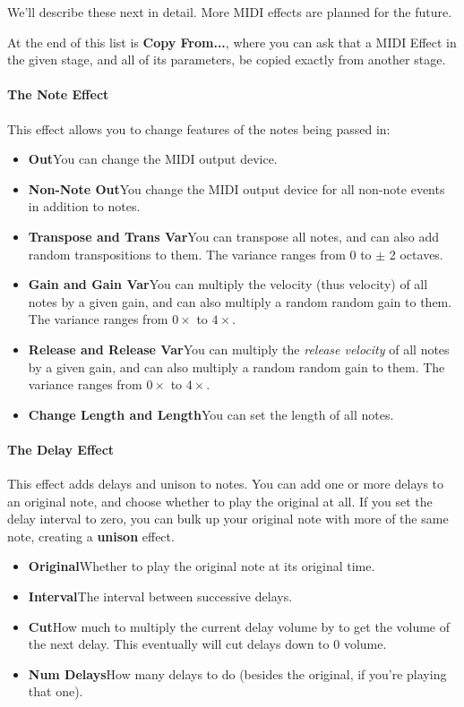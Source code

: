 \documentclass[twoside,10pt]{article}
\begin{document}
We'll describe these next in detail.  More MIDI effects are planned for the future.

At the end of this list is {\bf Copy From...}, where you can ask that a MIDI Effect in the given stage, and all of its parameters, be copied exactly from another stage.

\paragraph{The Note Effect}

This effect allows you to change features of the notes being passed in:

\begin{itemize}
\item {\bf Out}\qquad You can change the MIDI output device.
\item {\bf Non-Note Out}\qquad You change the MIDI output device for all non-note events in addition to notes.
\item {\bf Transpose and Trans Var}\qquad You can transpose all notes, and can also add random transpositions to them.  The variance ranges from \(0\) to \(\pm\) 2 octaves.
\item {\bf Gain and Gain Var}\qquad You can multiply the velocity (thus velocity) of all notes by a given gain, and can also multiply a random random gain to them.  The variance ranges from \(0\times\) to \(4\times\).
\item {\bf Release and Release Var}\qquad You can multiply the {\it release velocity} of all notes by a given gain, and can also multiply a random random gain to them.  The variance ranges from \(0\times\) to \(4\times\).
\item {\bf Change Length and Length}\qquad You can set the length of all notes.
\end{itemize}

\paragraph{The Delay Effect}

This effect adds delays and unison to notes.  You can add one or more delays to an original note, and choose whether to play the original at all.  If you set the delay interval to zero, you can bulk up your original note with more of the same note, creating a {\bf unison} effect.

\begin{itemize}
\item {\bf Original}\qquad Whether to play the original note at its original time.
\item {\bf Interval}\qquad The interval between successive delays. 
\item {\bf Cut}\qquad How much to multiply the current delay volume by to get the volume of the next delay.  This eventually will cut delays down to 0 volume.
\item {\bf Num Delays}\qquad How many delays to do (besides the original, if you're playing that one).
\end{itemize}
\end{document}
